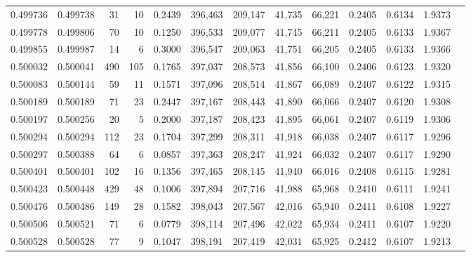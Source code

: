\begin{tabular}{rrrrrrrrrrrrr}
0.499736 & 0.499738 &    31 &    10 &                                     0.2439 & 396,463 & 209,147 &  41,735 &  66,221 & 0.2405 & 0.6134 & 1.9373 \\
0.499778 & 0.499806 &    70 &    10 &                                     0.1250 & 396,533 & 209,077 &  41,745 &  66,211 & 0.2405 & 0.6133 & 1.9367 \\
0.499855 & 0.499987 &    14 &     6 &                                     0.3000 & 396,547 & 209,063 &  41,751 &  66,205 & 0.2405 & 0.6133 & 1.9366 \\
0.500032 & 0.500041 &   490 &   105 &                                     0.1765 & 397,037 & 208,573 &  41,856 &  66,100 & 0.2406 & 0.6123 & 1.9320 \\
0.500083 & 0.500144 &    59 &    11 &                                     0.1571 & 397,096 & 208,514 &  41,867 &  66,089 & 0.2407 & 0.6122 & 1.9315 \\
0.500189 & 0.500189 &    71 &    23 &                                     0.2447 & 397,167 & 208,443 &  41,890 &  66,066 & 0.2407 & 0.6120 & 1.9308 \\
0.500197 & 0.500256 &    20 &     5 &                                     0.2000 & 397,187 & 208,423 &  41,895 &  66,061 & 0.2407 & 0.6119 & 1.9306 \\
0.500294 & 0.500294 &   112 &    23 &                                     0.1704 & 397,299 & 208,311 &  41,918 &  66,038 & 0.2407 & 0.6117 & 1.9296 \\
0.500297 & 0.500388 &    64 &     6 &                                     0.0857 & 397,363 & 208,247 &  41,924 &  66,032 & 0.2407 & 0.6117 & 1.9290 \\
0.500401 & 0.500401 &   102 &    16 &                                     0.1356 & 397,465 & 208,145 &  41,940 &  66,016 & 0.2408 & 0.6115 & 1.9281 \\
0.500423 & 0.500448 &   429 &    48 &                                     0.1006 & 397,894 & 207,716 &  41,988 &  65,968 & 0.2410 & 0.6111 & 1.9241 \\
0.500476 & 0.500486 &   149 &    28 &                                     0.1582 & 398,043 & 207,567 &  42,016 &  65,940 & 0.2411 & 0.6108 & 1.9227 \\
0.500506 & 0.500521 &    71 &     6 &                                     0.0779 & 398,114 & 207,496 &  42,022 &  65,934 & 0.2411 & 0.6107 & 1.9220 \\
0.500528 & 0.500528 &    77 &     9 &                                     0.1047 & 398,191 & 207,419 &  42,031 &  65,925 & 0.2412 & 0.6107 & 1.9213 \\

\end{tabular}
